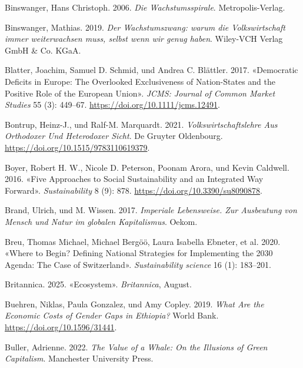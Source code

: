 \documentclass[
  nswissgerman,
  a4paper,
  DIV=11,
  numbers=noendperiod,
  oneside,
  openany]{scrreprt}
\newlength{\cslhangindent}
\newenvironment{CSLReferences}[2] %
 {\begin{list}{}{%
  \setlength{\itemindent}{0pt}
  \setlength{\leftmargin}{0pt}
  \setlength{\parsep}{0pt}
  \ifodd #1
   \setlength{\leftmargin}{\cslhangindent}
   \setlength{\itemindent}{-1\cslhangindent}
  \fi
  \setlength{\itemsep}{#2\baselineskip}}}
 {\end{list}}
\begin{document}
\begin{CSLReferences}{1}{1}
Binswanger, Hans Christoph. 2006. \emph{Die {Wachstumsspirale}}.
Metropolis-Verlag.

Binswanger, Mathias. 2019. \emph{{Der Wachstumszwang: warum die
Volkswirtschaft immer weiterwachsen muss, selbst wenn wir genug haben}}.
Wiley-VCH Verlag GmbH \& Co. KGaA.

Blatter, Joachim, Samuel D. Schmid, und Andrea C. Blättler. 2017.
{«Democratic {Deficits} in {Europe}: {The Overlooked Exclusiveness} of
{Nation-States} and the {Positive Role} of the {European Union}»}.
\emph{JCMS: Journal of Common Market Studies} 55 (3): 449--67.
\url{https://doi.org/10.1111/jcms.12491}.

Bontrup, Heinz-J., und Ralf-M. Marquardt. 2021.
\emph{Volkswirtschaftslehre Aus Orthodoxer Und Heterodoxer {Sicht}}. De
Gruyter Oldenbourg. \url{https://doi.org/10.1515/9783110619379}.

Boyer, Robert H. W., Nicole D. Peterson, Poonam Arora, und Kevin
Caldwell. 2016. {«Five {Approaches} to {Social Sustainability} and an
{Integrated Way Forward}»}. \emph{Sustainability} 8 (9): 878.
\url{https://doi.org/10.3390/su8090878}.

Brand, Ulrich, und M. Wissen. 2017. \emph{Imperiale {Lebensweise}. {Zur}
{Ausbeutung} von {Mensch} und {Natur} im globalen {Kapitalismus}}.
Oekom.

Breu, Thomas Michael, Michael Bergöö, Laura Isabella Ebneter, et al.
2020. {«Where to Begin? {Defining} National Strategies for Implementing
the 2030 {Agenda}: The Case of {Switzerland}»}. \emph{Sustainability
science} 16 (1): 183--201.

Britannica. 2025. {«Ecosystem»}. \emph{Britannica}, August.

Buehren, Niklas, Paula Gonzalez, und Amy Copley. 2019. \emph{What {Are}
the {Economic Costs} of {Gender Gaps} in {Ethiopia}?} World Bank.
\url{https://doi.org/10.1596/31441}.

Buller, Adrienne. 2022. \emph{The {Value} of a {Whale}: {On} the
{Illusions} of {Green Capitalism}}. Manchester University Press.


\end{CSLReferences}
\end{document}
